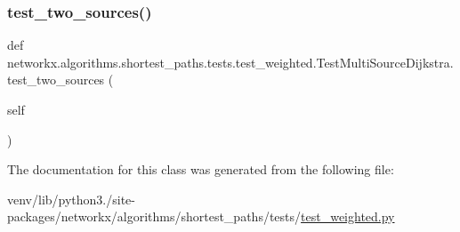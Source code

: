 \subsubsection{\texorpdfstring{test\+\_\+two\+\_\+sources()}{test\_two\_sources()}}
{\footnotesize\ttfamily def networkx.\+algorithms.\+shortest\+\_\+paths.\+tests.\+test\+\_\+weighted.\+Test\+Multi\+Source\+Dijkstra.\+test\+\_\+two\+\_\+sources (\begin{DoxyParamCaption}\item[{}]{self }\end{DoxyParamCaption})}



The documentation for this class was generated from the following file\+:\begin{DoxyCompactItemize}
\item 
venv/lib/python3./site-\/packages/networkx/algorithms/shortest\+\_\+paths/tests/\hyperlink{test__weighted_8py}{test\+\_\+weighted.\+py}\end{DoxyCompactItemize}
